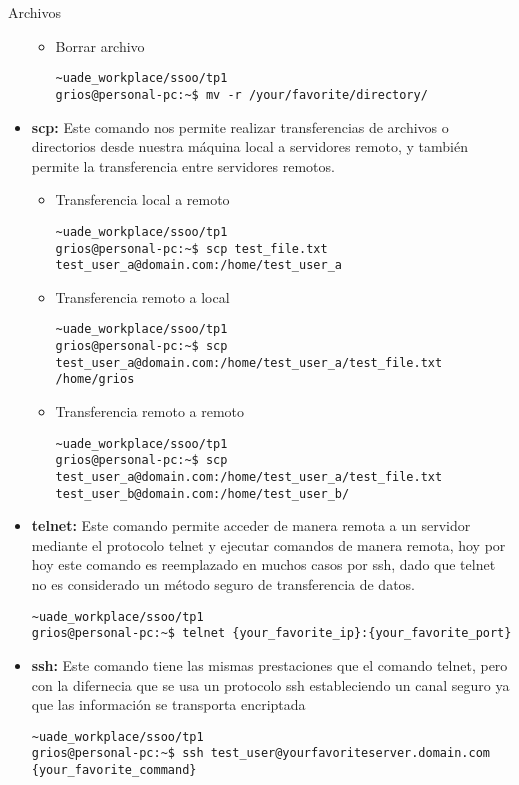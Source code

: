 \begin{section}{Archivos}
\begin{itemize}
\begin{itemize}
\item Borrar archivo
\begin{lstlisting}[style=Ubuntu]
~uade_workplace/ssoo/tp1
grios@personal-pc:~$ mv -r /your/favorite/directory/
\end{lstlisting}

\end{itemize}


\item \textbf{scp:}
Este comando nos permite realizar transferencias de archivos o directorios desde nuestra máquina local a servidores remoto, y también permite la transferencia entre servidores remotos.

\begin{itemize}
\item Transferencia local a remoto
\begin{lstlisting}[style=Ubuntu]
~uade_workplace/ssoo/tp1
grios@personal-pc:~$ scp test_file.txt test_user_a@domain.com:/home/test_user_a
\end{lstlisting}

\item Transferencia remoto a local
\begin{lstlisting}[style=Ubuntu]
~uade_workplace/ssoo/tp1
grios@personal-pc:~$ scp test_user_a@domain.com:/home/test_user_a/test_file.txt /home/grios
\end{lstlisting}

\item Transferencia remoto a remoto
\begin{lstlisting}[style=Ubuntu]
~uade_workplace/ssoo/tp1
grios@personal-pc:~$ scp test_user_a@domain.com:/home/test_user_a/test_file.txt test_user_b@domain.com:/home/test_user_b/
\end{lstlisting}

\end{itemize}

\item \textbf{telnet:}
Este comando permite acceder de manera remota a un servidor mediante el protocolo telnet y ejecutar comandos de manera remota, hoy por hoy este comando es reemplazado en muchos casos por ssh, dado que telnet no es considerado un método seguro de transferencia de datos.
\begin{lstlisting}[style=Ubuntu]
~uade_workplace/ssoo/tp1
grios@personal-pc:~$ telnet {your_favorite_ip}:{your_favorite_port}
\end{lstlisting}

\item \textbf{ssh:}
Este comando tiene las mismas prestaciones que el comando telnet, pero con la difernecia que se usa un protocolo ssh estableciendo un canal seguro ya que las información se transporta encriptada
\begin{lstlisting}[style=Ubuntu]
~uade_workplace/ssoo/tp1
grios@personal-pc:~$ ssh test_user@yourfavoriteserver.domain.com {your_favorite_command}
\end{lstlisting}


\end{itemize}
\end{section}

